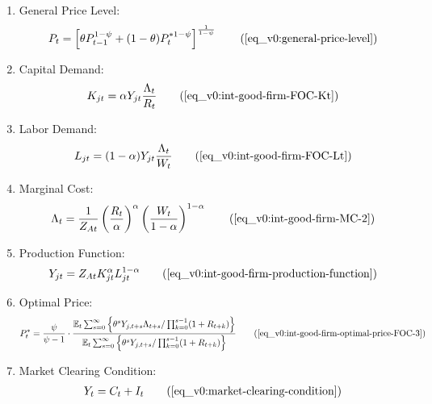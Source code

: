 \documentclass[../thesis.tex]{subfiles}
\begin{document}
{\begin{itemize}
\begin{enumerate}
				\item General Price Level:
				\begin{align}
					P_t = \left[ \theta P_{t-1}^{1-\psi} + (1-\theta) P_t^{\ast 1-\psi} \right]^\frac{1}{1-\psi}
					\tag{\ref{eq_v0:general-price-level}}
				\end{align}
				
				\item Capital Demand:
				\begin{align}
					K_{jt} = \alpha Y_{jt} \frac{\Lambda_t}{R_t}
					\tag{\ref{eq_v0:int-good-firm-FOC-Kt}}
				\end{align}
				
				\item Labor Demand:
				\begin{align}
					L_{jt} = (1-\alpha) Y_{jt} \frac{\Lambda_t}{W_t}
					\tag{\ref{eq_v0:int-good-firm-FOC-Lt}}
				\end{align}
				
				
				\item Marginal Cost:
				\begin{align}
					\Lambda_t = \frac{1}{Z_{At}} \left( \frac{R_t}{\alpha} \right)^{\alpha} \left( \frac{W_t}{1-\alpha} \right)^{1-\alpha}
					\tag{\ref{eq_v0:int-good-firm-MC-2}}
				\end{align}
				
				\item Production Function:
				\begin{align}
					Y_{jt} = Z_{At} K_{jt}^\alpha L_{jt}^{1-\alpha}
					\tag{\ref{eq_v0:int-good-firm-production-function}}
				\end{align}
				
				\item Optimal Price:
				\begin{align}
					P_t^\ast = \frac{\psi}{\psi-1} \cdot \frac{ \E \sum_{s=0}^{\infty} \left\{ \theta^s Y_{j,t+s} \Lambda_{t+s} / \prod_{k=0}^{s-1}(1+R_{t+k}) \right\} } {\E \sum_{s=0}^{\infty} \left\{ \theta^s Y_{j,t+s} / \prod_{k=0}^{s-1}(1 + R_{t+k}) \right\}} \tag{\ref{eq_v0:int-good-firm-optimal-price-FOC-3}}
				\end{align}
				
				\item Market Clearing Condition:
				\begin{align}
					Y_t = C_t + I_t
					\tag{\ref{eq_v0:market-clearing-condition}}
				\end{align}
				

\end{enumerate}
\end{itemize}}
\end{document}

